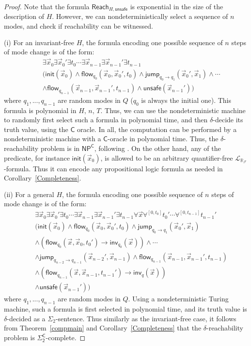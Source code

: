 \documentclass[envcountsect]{llncs}
\newcommand{\flow}{\mathsf{flow}}
\newcommand{\jump}{\mathsf{jump}}
\newcommand{\inv}{\mathsf{inv}}
\newcommand{\init}{\mathsf{init}}
\newcommand{\reach}{\mathsf{Reach}}
\newcommand{\unsafe}{\mathsf{unsafe}}
\newcommand{\lrf}{\mathcal{L}_{\mathbb{R}_{\mathcal{F}}}}
\begin{document}
\begin{proof}
Note that the formula $\reach_{H,\unsafe}$  is exponential in the size of the
description of $H$. However, we can nondeterministically select a sequence of
$n$ modes, and check if reachability can be witnessed.

(i) For an invariant-free $H$, the formula  encoding one possible sequence of
$n$ steps of mode change is of the form:
\begin{eqnarray*}
& &\exists \vec x_0 \exists \vec x_0'\exists t_0\cdots \exists \vec
x_{n-1}\exists\vec x_{n-1}'\exists t_{n-1}\\
& &\Big(\init(\vec x_0)\wedge \flow_{q_0}(\vec x_0, \vec x_0', t_0)\wedge
\jump_{q_0\rightarrow q_1}(\vec x_0', \vec x_1)\wedge \cdots\\
& &\wedge \flow_{q_{n-1}}(\vec x_{n-1}, \vec x_{n-1}', t_{n-1}) \wedge
\unsafe(\vec x_{n-1}')\Big)
\end{eqnarray*}
where $q_1,...,q_{n-1}$ are random modes in $Q$ ($q_0$ is always the initial
one). This formula is polynomial in $H$, $n$, $T$. Thus, we can use the
nondeterministic machine to randomly first select such a formula in polynomial
time, and then $\delta$-decide its truth value, using the $\mathsf{C}$ oracle.
In all, the computation can be performed by a nondeterministic machine with a
$\mathsf{C}$-oracle in polynomial time. Thus, the $\delta$-reachability problem
is in $\mathsf{NP^C}$, following . On the other hand, any of the predicate, for
instance $\init(\vec x_0)$, is allowed to be an arbitrary quantifier-free
$\lrf$-formula. Thus it can encode any propositional logic formula as needed in
Corollary~\ref{Completeness}.

(ii) For a general $H$, the formula encoding one possible sequence of $n$ steps
of mode change is of the form:
\begin{eqnarray*}
& &\exists \vec x_0 \exists \vec x_0'\exists t_0\cdots \exists \vec
x_{n-1}\exists\vec x_{n-1}'\exists t_{n-1} \forall \vec x
\forall^{[0,t_0]}t_0'\cdots \forall^{[0,t_{n-1}]}t_{n-1}'\\
& &\Big(\init(\vec x_0)\wedge \flow_{q_0}(\vec x_0, \vec x_0', t_0)\wedge
\jump_{q_0\rightarrow q_1}(\vec x_0', \vec x_1)\\
& &\wedge (\flow_{q_0}(\vec x, \vec x_0, t_0')\rightarrow \inv_{q_0}(\vec
x))\wedge \cdots\\
& &\wedge\jump_{q_{n-2}\rightarrow q_{n-1}}(\vec x_{n-2}', \vec x_{n-1}) \wedge
\flow_{q_{n-1}}(\vec x_{n-1}, \vec x_{n-1}', t_{n-1})\\
& &\wedge (\flow_{q_{n-1}}(\vec x, \vec x_{n-1}, t_{n-1}')\rightarrow
\inv_q(\vec x))\\
& &\wedge \unsafe(\vec x_{n-1}')\Big)
\end{eqnarray*}
where $q_1,...,q_{n-1}$ are random modes in $Q$. Using a nondeterministic
Turing machine, such a formula is first selected in polynomial time, and its
truth value is $\delta$-decided as a $\Sigma_2$-sentence. Thus similarly as the
invariant-free case, it follows from Theorem~\ref{compmain} and
Corollary~\ref{Completeness} that the $\delta$-reachability problem is
$\mathsf{\Sigma_2^C}$-complete.
\end{proof}
\end{document}
